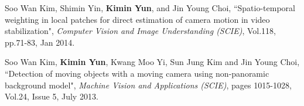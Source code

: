 \documentclass[10pt]{article}
\makeatletter
\newlength{\bibhang}
\newlength{\bibsep}
 {\@listi \global\bibsep\itemsep \global\advance\bibsep by\parsep}
\newenvironment{bibsection}%
        {\vspace{-\baselineskip}\begin{list}{}{%
       \setlength{\leftmargin}{\bibhang}%
       \setlength{\itemindent}{-\leftmargin}%
       \setlength{\itemsep}{\bibsep}%
       \setlength{\parsep}{\z@}%
        \setlength{\partopsep}{0pt}%
        \setlength{\topsep}{0pt}}}
        {\end{list}\vspace{-.6\baselineskip}}
\makeatother
\begin{document}
\begin{bibsection}
		\item Soo Wan Kim, Shimin Yin, \textbf{Kimin Yun}, and Jin Young Choi,
				``Spatio-temporal weighting in local patches for direct estimation of camera motion in video stabilization",
				\emph{Computer Vision and Image Understanding (SCIE)}, Vol.118, pp.71-83, Jan 2014.

		\item Soo Wan Kim, \textbf{Kimin Yun}, Kwang Moo Yi, Sun Jung Kim and Jin Young Choi,
				``Detection of moving objects with a moving camera using non-panoramic background model",
				\emph{Machine Vision and Applications (SCIE)}, pages 1015-1028, Vol.24, Issue 5, July 2013.


\end{bibsection}

\end{document}
